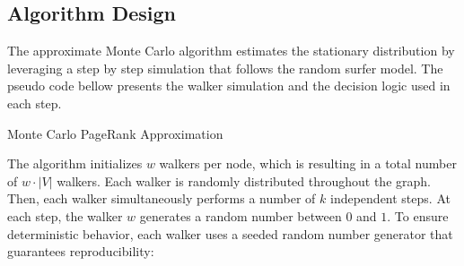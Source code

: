 \subsection{Algorithm Design}


The approximate Monte Carlo algorithm estimates the stationary distribution by leveraging a step by step simulation that follows the random surfer model.
The pseudo code bellow presents the walker simulation and the decision logic used in each step.

\vspace{1.5em}
\begin{algorithm}[H]
\caption{Monte Carlo PageRank Approximation}

\end{algorithm}
\vspace{1.5em}

The algorithm initializes $w$ walkers per node, which is resulting in a total number of $w\cdot |V|$ walkers. Each walker is randomly distributed throughout the graph. Then, each walker simultaneously performs a number of $k$ independent steps.
At each step, the walker $w$ generates a random number between $0$ and $1$. To ensure deterministic behavior, each walker uses a seeded random number generator that guarantees reproducibility:

